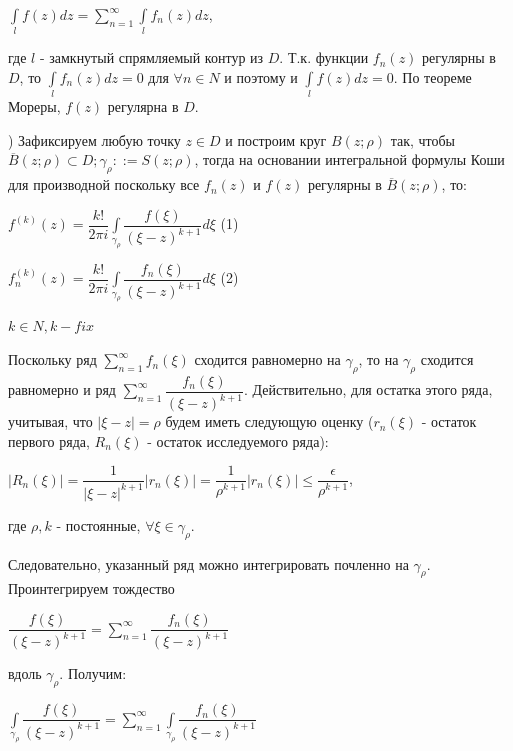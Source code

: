 \documentclass[a4paper, 12pt]{report}
\begin{document}
\begin{center}
    $\int\limits_l f(z)dz = \sum\limits_{n=1}^{\infty}\int\limits_l f_n(z)dz$,
\end{center}

где $l$ - замкнутый спрямляемый контур из $D$. Т.к. функции $f_n(z)$ регулярны в $D$, то $\int\limits_l f_n(z)dz = 0$ для $\forall n \in N$ и поэтому и $\int\limits_l f(z)dz = 0$. По теореме Мореры, $f(z)$ регулярна в $D$.
\par{}) Зафиксируем любую точку $z \in D$ и построим круг $B(z; \rho)$ так, чтобы $\overline{B}(z; \rho) \subset D; \gamma_{\rho} ::= S(z; \rho)$, тогда на основании интегральной формулы Коши для производной поскольку все $f_n(z)$ и $f(z)$ регулярны в $\overline{B}(z; \rho)$, то:

\begin{center}
    $f^{(k)}(z) = \dfrac{k!}{2\pi i} \int\limits_{\gamma_{\rho}}\dfrac{f(\xi)}{(\xi - z)^{k+1}}d\xi$ (1)
    \par\bigskip
    $f_n^{(k)}(z) = \dfrac{k!}{2\pi i} \int\limits_{\gamma_{\rho}}\dfrac{f_n(\xi)}{(\xi - z)^{k+1}}d\xi$ (2)
    \par\bigskip
    $k \in N, k - fix$
\end{center}
\par\bigskip
Поскольку ряд $\sum\limits_{n=1}^{\infty}f_n(\xi)$ сходится равномерно на $\gamma_{\rho}$, то на $\gamma_{\rho}$ сходится равномерно и ряд $\sum\limits_{n=1}^{\infty}\dfrac{f_n(\xi)}{(\xi - z)^{k+1}}$. Действительно, для остатка этого ряда, учитывая, что $|\xi - z| = \rho$ будем иметь следующую оценку ($r_n(\xi)$ - остаток первого ряда, $R_n(\xi)$ - остаток исследуемого ряда):

\begin{center}
    $|R_n(\xi)| = \dfrac{1}{|\xi - z|^{k+1}}|r_n(\xi)| = \dfrac{1}{\rho^{k+1}}|r_n(\xi)| \leq \dfrac{\epsilon}{\rho^{k+1}}$,
\end{center}

где $\rho, k$ - постоянные, $\forall \xi \in \gamma_{\rho}$.

Следовательно, указанный ряд можно интегрировать почленно на $\gamma_{\rho}$. Проинтегрируем тождество

\begin{center}
    $\dfrac{f(\xi)}{(\xi - z)^{k+1}} = \sum\limits_{n=1}^{\infty}\dfrac{f_n(\xi)}{(\xi - z)^{k+1}}$
\end{center}

вдоль $\gamma_{\rho}$. Получим:

\begin{center}
    $\int\limits_{\gamma_{\rho}}\dfrac{f(\xi)}{(\xi - z)^{k+1}} = \sum\limits_{n=1}^{\infty}\int\limits_{\gamma_{\rho}}\dfrac{f_n(\xi)}{(\xi - z)^{k+1}}$
\end{center}
\end{document}
